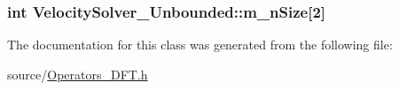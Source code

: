 \subsubsection[{m\+\_\+n\+Size}]{\setlength{\rightskip}{0pt plus 5cm}int Velocity\+Solver\+\_\+\+Unbounded\+::m\+\_\+n\+Size\mbox{[}2\mbox{]}\hspace{0.3cm}{\ttfamily [protected]}}\label{class_velocity_solver___unbounded_a5a06247f4313780a5cb906d64bcd8f80}


The documentation for this class was generated from the following file\+:\begin{DoxyCompactItemize}
\item 
source/\hyperlink{_operators___d_f_t_8h}{Operators\+\_\+\+D\+F\+T.\+h}\end{DoxyCompactItemize}
